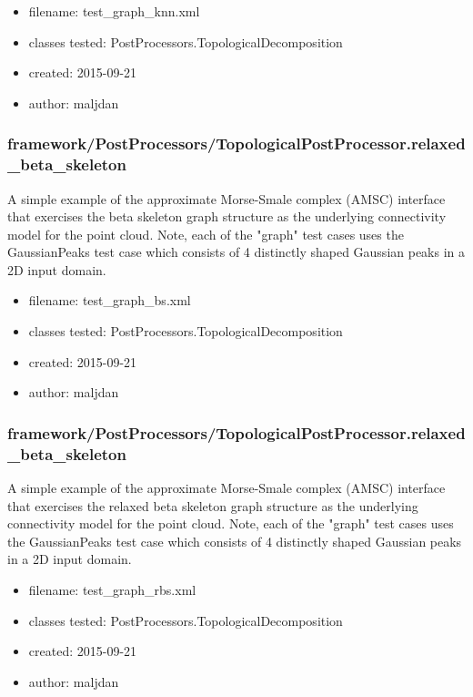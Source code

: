       \begin{itemize}
          \item filename: test\_graph\_knn.xml
          \item classes tested: PostProcessors.TopologicalDecomposition
          \item created: 2015-09-21
          \item author: maljdan
      \end{itemize}
    \subsubsection{framework/PostProcessors/TopologicalPostProcessor.relaxed\_beta\_skeleton}
      
       A simple example of the approximate Morse-Smale complex (AMSC) interface
       that exercises the beta skeleton graph structure as the underlying
       connectivity model for the point cloud. Note, each of the "graph" test
       cases uses the GaussianPeaks test case which consists of 4 distinctly
       shaped Gaussian peaks in a 2D input domain.
    
      \begin{itemize}
          \item filename: test\_graph\_bs.xml
          \item classes tested: PostProcessors.TopologicalDecomposition
          \item created: 2015-09-21
          \item author: maljdan
      \end{itemize}
    \subsubsection{framework/PostProcessors/TopologicalPostProcessor.relaxed\_beta\_skeleton}
      
       A simple example of the approximate Morse-Smale complex (AMSC) interface
       that exercises the relaxed beta skeleton graph structure as the
       underlying connectivity model for the point cloud. Note, each of the
       "graph" test cases uses the GaussianPeaks test case which consists of 4
       distinctly shaped Gaussian peaks in a 2D input domain.
    
      \begin{itemize}
          \item filename: test\_graph\_rbs.xml
          \item classes tested: PostProcessors.TopologicalDecomposition
          \item created: 2015-09-21
          \item author: maljdan
      \end{itemize}
